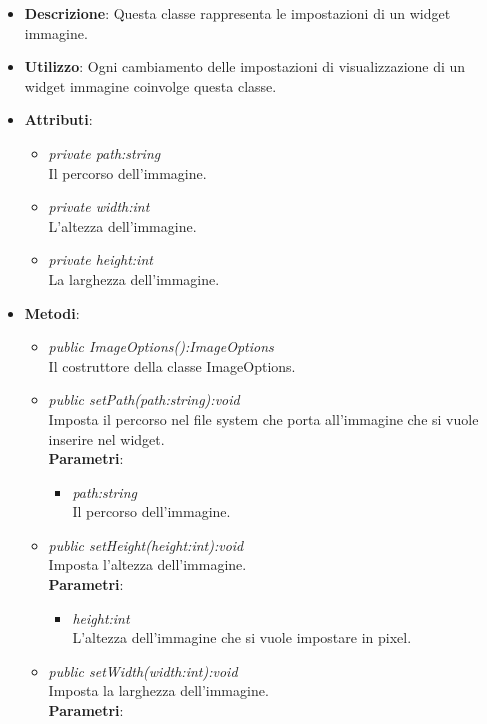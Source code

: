 \begin{itemize}
\item \textbf{Descrizione}: Questa classe rappresenta le impostazioni di un widget immagine.
\item \textbf{Utilizzo}: Ogni cambiamento delle impostazioni di visualizzazione di un widget immagine coinvolge questa classe.
\item \textbf{Attributi}:
	\begin{itemize}
	\item \textit{private path:string}\\
	Il percorso dell'immagine.
	\item \textit{private width:int}\\
	L'altezza dell'immagine. 
	\item \textit{private height:int}\\
	La larghezza dell'immagine. 
	\end{itemize}
\item \textbf{Metodi}:
	\begin{itemize}
	\item \textit{public ImageOptions():ImageOptions}\\
	Il costruttore della classe ImageOptions.
	\item \textit{public setPath(path:string):void}\\
	Imposta il percorso nel file system che porta all'immagine che si vuole inserire nel widget.
		\\ \textbf{Parametri}: \begin{itemize}
		\item \textit{path:string}\\
		Il percorso dell'immagine.
		\end{itemize} 
	\item \textit{public setHeight(height:int):void}\\
	Imposta l'altezza dell'immagine.
		\\ \textbf{Parametri}: \begin{itemize}
		\item \textit{height:int}\\
		L'altezza dell'immagine che si vuole impostare  in pixel.
		\end{itemize} 
	\item \textit{public setWidth(width:int):void}\\
	Imposta la larghezza dell'immagine.
		\\ \textbf{Parametri}: \begin{itemize}

\end{itemize}
\end{itemize}
\end{itemize}
